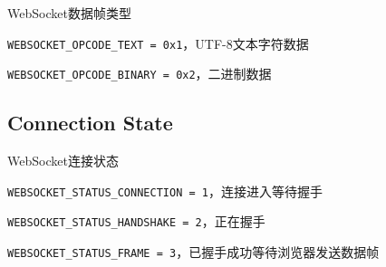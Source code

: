 WebSocket数据帧类型

\begin{compactitem}
\item \texttt{WEBSOCKET\_OPCODE\_TEXT = 0x1}，UTF-8文本字符数据
\item \texttt{WEBSOCKET\_OPCODE\_BINARY = 0x2}，二进制数据
\end{compactitem}


\subsection{Connection State}

WebSocket连接状态

\begin{compactitem}
\item \texttt{WEBSOCKET\_STATUS\_CONNECTION = 1}，连接进入等待握手
\item \texttt{WEBSOCKET\_STATUS\_HANDSHAKE = 2}，正在握手
\item \texttt{WEBSOCKET\_STATUS\_FRAME = 3}，已握手成功等待浏览器发送数据帧
\end{compactitem}





\begin{lstlisting}[language=PHP]

\end{lstlisting}








\begin{lstlisting}[language=PHP]

\end{lstlisting}




\begin{lstlisting}[language=PHP]

\end{lstlisting}




\begin{lstlisting}[language=PHP]

\end{lstlisting}




\begin{lstlisting}[language=PHP]

\end{lstlisting}




